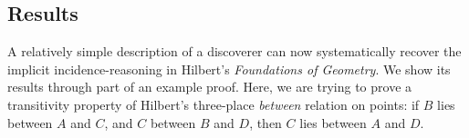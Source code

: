 














\subsection{Results}\label{sec:Results}
A relatively simple description of a discoverer can now systematically recover the implicit incidence-reasoning in Hilbert's \emph{Foundations of Geometry}. We show its results through part of an example proof. Here, we are trying to prove a transitivity property of Hilbert's three-place \emph{between} relation on points: if $B$ lies between $A$ and $C$, and $C$ between $B$ and $D$, then $C$ lies between $A$ and $D$.

\vspace{0.2cm}
\noindent{}
\vspace{0.1cm}

